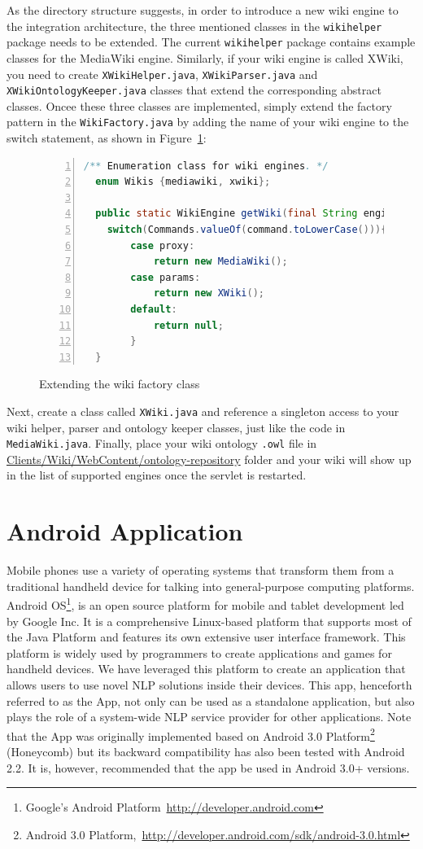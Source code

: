 As the directory structure suggests, in order to introduce a new wiki engine to the integration architecture, the three mentioned classes in the \texttt{wikihelper} package needs to be extended. The current \texttt{wikihelper} package contains example classes for the MediaWiki engine. Similarly, if your wiki engine is called XWiki, you need to create \texttt{XWikiHelper.java}, \texttt{XWikiParser.java} and \texttt{XWikiOntologyKeeper.java} classes that extend the corresponding abstract classes. Oncee these three classes are implemented, simply extend the factory pattern in the \texttt{WikiFactory.java} by adding the name of your wiki engine to the switch statement, as shown in Figure~\ref{list:wiki_factory_extend}:

\begin{figure}[h!]
\centering
\begin{lstlisting}[language=Java,numbers=left,xleftmargin=4mm,columns=flexible]
  /** Enumeration class for wiki engines. */
  enum Wikis {mediawiki, xwiki};

  public static WikiEngine getWiki(final String engine){
    switch(Commands.valueOf(command.toLowerCase())){
		case proxy:
			return new MediaWiki();
		case params:
			return new XWiki();
		default:
			return null;
		}
  }
\end{lstlisting}
\caption{Extending the wiki factory class}
\label{list:wiki_factory_extend}
\end{figure}

Next, create a class called \texttt{XWiki.java} and reference a singleton access to your wiki helper, parser and ontology keeper classes, just like the code in \texttt{MediaWiki.java}. Finally, place your wiki ontology \texttt{.owl} file in \url{Clients/Wiki/WebContent/ontology-repository} folder and your wiki will show up in the list of supported engines once the servlet is restarted.

\section{Android Application}
Mobile phones use a variety of operating systems that transform them from a traditional handheld device for talking into general-purpose computing platforms. Android OS\footnote{Google's Android Platform~\url{http://developer.android.com}}, is an open source platform for mobile and tablet development led by Google Inc. It is a comprehensive Linux-based platform that supports most of the Java Platform and features its own extensive user interface framework. This platform is widely used by programmers to create applications and games for handheld devices. We have leveraged this platform to create an application that allows users to use novel NLP solutions inside their devices. This app, henceforth referred to as the \sa App, not only can be used as a standalone application, but also plays the role of a system-wide NLP service provider for other applications. Note that the \sa App was originally implemented based on Android 3.0 Platform\footnote{Android 3.0 Platform,~\url{http://developer.android.com/sdk/android-3.0.html}} (Honeycomb) but its backward compatibility has also been tested with Android 2.2. It is, however, recommended that the app be used in Android 3.0+ versions.

